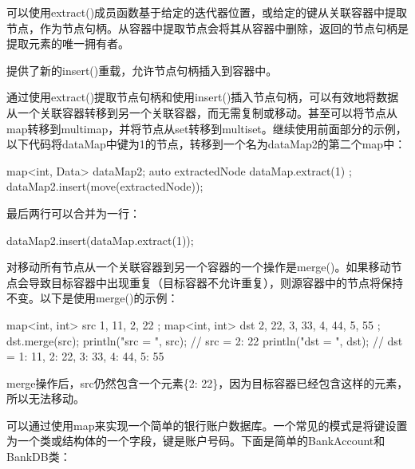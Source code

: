 可以使用extract()成员函数基于给定的迭代器位置，或给定的键从关联容器中提取节点，作为节点句柄。从容器中提取节点会将其从容器中删除，返回的节点句柄是提取元素的唯一拥有者。

提供了新的insert()重载，允许节点句柄插入到容器中。

通过使用extract()提取节点句柄和使用insert()插入节点句柄，可以有效地将数据从一个关联容器转移到另一个关联容器，而无需复制或移动。甚至可以将节点从map转移到multimap，并将节点从set转移到multiset。继续使用前面部分的示例，以下代码将dataMap中键为1的节点，转移到一个名为dataMap2的第二个map中：

\begin{cpp}
map<int, Data> dataMap2;
auto extractedNode { dataMap.extract(1) };
dataMap2.insert(move(extractedNode));
\end{cpp}

最后两行可以合并为一行：

\begin{cpp}
dataMap2.insert(dataMap.extract(1));
\end{cpp}

对移动所有节点从一个关联容器到另一个容器的一个操作是merge()。如果移动节点会导致目标容器中出现重复（目标容器不允许重复），则源容器中的节点将保持不变。以下是使用merge()的示例：

\begin{cpp}
map<int, int> src { {1, 11}, {2, 22} };
map<int, int> dst { {2, 22}, {3, 33}, {4, 44}, {5, 55} };
dst.merge(src);
println("src = {}", src); // src = {2: 22}
println("dst = {}", dst); // dst = {1: 11, 2: 22, 3: 33, 4: 44, 5: 55}
\end{cpp}

merge操作后，src仍然包含一个元素\{2: 22\}，因为目标容器已经包含这样的元素，所以无法移动。


可以通过使用map来实现一个简单的银行账户数据库。一个常见的模式是将键设置为一个类或结构体的一个字段，键是账户号码。下面是简单的BankAccount和BankDB类：


